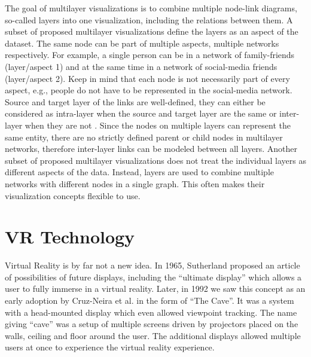 The goal of multilayer visualizations \label{exp:multilayer} is to combine multiple node-link diagrams, so-called layers into one visualization, including the relations between them. A subset of proposed multilayer visualizations define the layers as an aspect of the dataset. The same node can be part of multiple aspects, multiple networks respectively. For example, a single person can be in a network of family-friends (layer/aspect 1) and at the same time in a network of social-media friends (layer/aspect 2). Keep in mind that each node is not necessarily part of every aspect, e.g., people do not have to be represented in the social-media network.
Source and target layer of the links are well-defined, they can either be considered as intra-layer when the source and target layer are the same or inter-layer when they are not \cite{ghoniem_state_2019}. Since the nodes on multiple layers can represent the same entity, there are no strictly defined parent or child nodes in multilayer networks, therefore inter-layer links can be modeled between all layers.
Another subset of proposed multilayer visualizations does not treat the individual layers as different aspects of the data. Instead, layers are used to combine multiple networks with different nodes in a single graph. This often makes their visualization concepts flexible to use. 

\section{VR Technology}
\label{chap:bg-vrtech}
Virtual Reality is by far not a new idea. In 1965, Sutherland \cite{Sutherland65theultimate} proposed an article of possibilities of future displays, including the “ultimate display” which allows a user to fully immerse in a virtual reality. Later, in 1992 we saw this concept as an early adoption by Cruz-Neira et al. \cite{cruz-neira_cave_1992} in the form of “The Cave”. It was a system with a head-mounted display which even allowed viewpoint tracking. The name giving “cave” was a setup of multiple screens driven by projectors placed on the walls, ceiling and floor around the user. The additional displays allowed multiple users at once to experience the virtual reality experience.  

